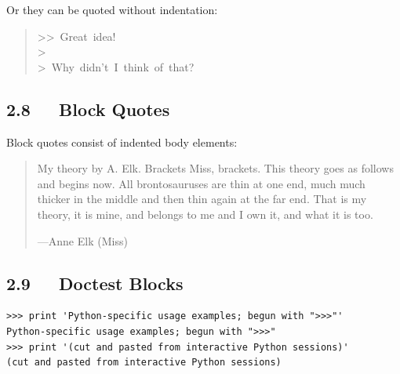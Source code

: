 \documentclass[10pt,a4paper,english]{article}
\begin{document}
Or they can be quoted without indentation:
\begin{quote}{\ttfamily \raggedright \noindent
>>~Great~idea!~\\
>~\\
>~Why~didn't~I~think~of~that?
}\end{quote}



\hypertarget{block-quotes}{}
\subsection*{2.8~~~Block Quotes}

Block quotes consist of indented body elements:
\begin{quote}

My theory by A. Elk.  Brackets Miss, brackets.  This theory goes
as follows and begins now.  All brontosauruses are thin at one
end, much much thicker in the middle and then thin again at the
far end.  That is my theory, it is mine, and belongs to me and I
own it, and what it is too.

\begin{flushright}
---Anne Elk (Miss)
\end{flushright}
\end{quote}



\hypertarget{doctest-blocks}{}
\subsection*{2.9~~~Doctest Blocks}
\begin{verbatim}>>> print 'Python-specific usage examples; begun with ">>>"'
Python-specific usage examples; begun with ">>>"
>>> print '(cut and pasted from interactive Python sessions)'
(cut and pasted from interactive Python sessions)\end{verbatim}



\hypertarget{footnotes}{}
\end{document}
